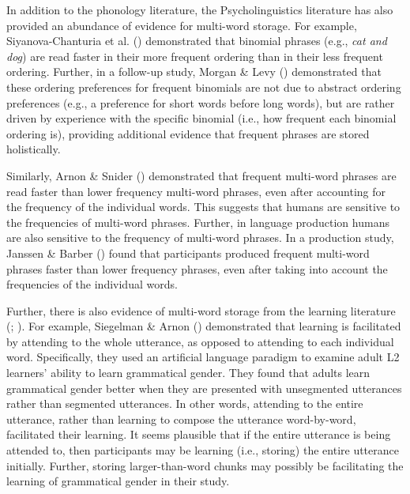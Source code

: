 \documentclass[
  12pt,
  letterpaper,
]{scrreprt}
\begin{document}
In addition to the phonology literature, the Psycholinguistics
literature has also provided an abundance of evidence for multi-word
storage. For example, Siyanova-Chanturia et al.
()
demonstrated that binomial phrases (e.g., \emph{cat and dog}) are read
faster in their more frequent ordering than in their less frequent
ordering. Further, in a follow-up study, Morgan \& Levy
() demonstrated
that these ordering preferences for frequent binomials are not due to
abstract ordering preferences (e.g., a preference for short words before
long words), but are rather driven by experience with the specific
binomial (i.e., how frequent each binomial ordering is), providing
additional evidence that frequent phrases are stored holistically.

Similarly, Arnon \& Snider
() demonstrated that
frequent multi-word phrases are read faster than lower frequency
multi-word phrases, even after accounting for the frequency of the
individual words. This suggests that humans are sensitive to the
frequencies of multi-word phrases. Further, in language production
humans are also sensitive to the frequency of multi-word phrases. In a
production study, Janssen \& Barber
() found that
participants produced frequent multi-word phrases faster than lower
frequency phrases, even after taking into account the frequencies of the
individual words.

Further, there is also evidence of multi-word storage from the learning
literature (;
). For example, Siegelman \& Arnon
() demonstrated
that learning is facilitated by attending to the whole utterance, as
opposed to attending to each individual word. Specifically, they used an
artificial language paradigm to examine adult L2 learners' ability to
learn grammatical gender. They found that adults learn grammatical
gender better when they are presented with unsegmented utterances rather
than segmented utterances. In other words, attending to the entire
utterance, rather than learning to compose the utterance word-by-word,
facilitated their learning. It seems plausible that if the entire
utterance is being attended to, then participants may be learning (i.e.,
storing) the entire utterance initially. Further, storing
larger-than-word chunks may possibly be facilitating the learning of
grammatical gender in their study.
\end{document}
